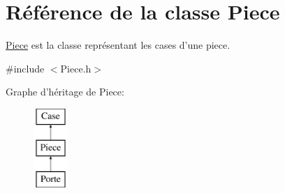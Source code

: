 \hypertarget{classPiece}{\section{\-Référence de la classe \-Piece}
\label{classPiece}
}


\hyperlink{classPiece}{\-Piece} est la classe représentant les cases d'une piece.  




{\ttfamily \#include $<$\-Piece.\-h$>$}

\-Graphe d'héritage de \-Piece\-:\begin{figure}[H]
\begin{center}
\leavevmode
\includegraphics[height=3.000000cm]{classPiece}
\end{center}
\end{figure}
